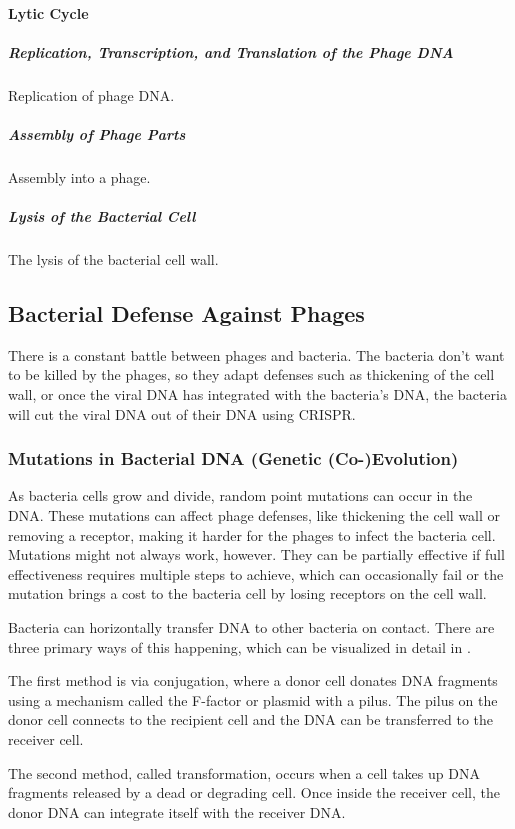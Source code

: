 \paragraph{Lytic Cycle}
\subparagraph{Replication, Transcription, and Translation of the Phage DNA}
Replication of phage DNA. 
\subparagraph{Assembly of Phage Parts}
Assembly into a phage. 
\subparagraph{Lysis of the Bacterial Cell}
The lysis of the bacterial cell wall. 


\subsection{Bacterial Defense Against Phages} 
There is a constant battle between phages and bacteria. 
The bacteria don't want to be killed by the phages, so they adapt defenses such as thickening of the cell wall, or once the viral DNA has integrated with the bacteria's DNA, the bacteria will cut the viral DNA out of their DNA using CRISPR. 
\cite{iglerPhenotypicFluxRole2022}

\subsubsection{Mutations in Bacterial DNA (Genetic (Co-)Evolution)}
As bacteria cells grow and divide, random point mutations can occur in the DNA. 
These mutations can affect phage defenses, like thickening the cell wall or removing a receptor, making it harder for the phages to infect the bacteria cell. 
Mutations might not always work, however. 
They can be partially effective if full effectiveness requires multiple steps to achieve, which can occasionally fail \cite{lenskiTWOSTEPRESISTANCEESCHERICHIA1984} or the mutation brings a cost to the bacteria cell by losing receptors on the cell wall. \newline

Bacteria can horizontally transfer DNA to other bacteria on contact. 
There are three primary ways of this happening, which can be visualized in detail in . 

The first method is via conjugation, where a donor cell donates DNA fragments using a mechanism called the F-factor or plasmid with a pilus. 
The pilus on the donor cell connects to the recipient cell and the DNA can be transferred to the receiver cell. 

The second method, called transformation, occurs when a cell takes up DNA fragments released by a dead or degrading cell. 
Once inside the receiver cell, the donor DNA can integrate itself with the receiver DNA. 


